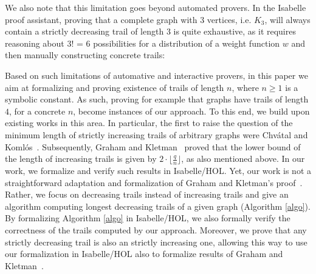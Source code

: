 \begin{isabellebody}
\begin{isamarkuptext}
We also note that this limitation goes beyond automated provers. In the Isabelle proof assistant, 
proving that a complete graph with 3 vertices, i.e. $K_3$,  will
always contain a strictly decreasing trail of length 3 is quite exhaustive, as it requires reasoning about 3! = 6 possibilities
for a distribution of a weight function $w$ and then manually constructing concrete trails:

\begin{center}

\end{center}

Based on such limitations of automative and interactive provers, in this paper we aim at formalizing 
and proving existence of trails of length $n$, where $n\geq 1$ is a symbolic constant. As such, 
proving for example that graphs have trails of length $4$, for a concrete $n$,  become instances 
of our approach. To this end, we build upon existing works in this area. In particular, the first 
to raise the question of the minimum length of strictly increasing
trails of arbitrary graphs  were Chv\'atal and Koml\'os~\cite{chvatal1970some}. Subsequently, 
Graham and Kletman~\cite{graham1973increasing} proved that the lower bound of the length of increasing trails 
is given by $2 \cdot \lfloor\frac{q}{n}\rfloor$, as also mentioned above. In our work, we formalize and verify 
such results in Isabelle/HOL. Yet, our work is not a straightforward adaptation and formalization   
of Graham and Kletman's proof~\cite{graham1973increasing}. Rather, we focus on decreasing trails instead of increasing trails 
and give an algorithm computing longest decreasing trails of a given graph (Algorithm \ref{algo}).  
By formalizing Algorithm \ref{algo} in Isabelle/HOL, we also formally verify the correctness 
of the trails computed by our approach. Moreover, we prove that any strictly decreasing trail is also an strictly increasing 
one, allowing this way to use our formalization in Isabelle/HOL also to formalize results of Graham and Kletman~\cite{graham1973increasing}.


\end{isamarkuptext}
\end{isabellebody}
